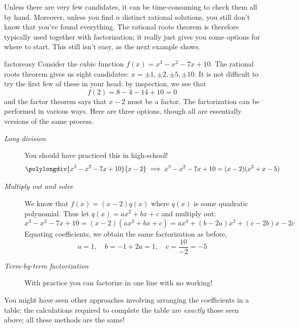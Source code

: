 Unless there are very few candidates, it can be time-consuming to check them all by hand. Moreover, unless you find $n$ distinct rational solutions, you still don't know that you've found everything. The rational roots theorem is therefore typically used together with factorization; it really just gives you some options for where to start. This still isn't easy, as the next example shows.
\goodbreak

\begin{example}{}{factoreasy}
Consider the cubic function $f(x)=x^3-x^2-7x+10$. The rational roots theorem gives us eight candidates: $x=\pm 1,\pm 2,\pm 5,\pm 10$. It is not difficult to try the first few of these in your head: by inspection, we see that
\[f(2)=8-4-14+10=0\]
and the factor theorem says that $x-2$ must be a factor. The factorization can be performed in various ways. Here are three options, though all are essentially versions of the same process.
\begin{description}
	\item[\normalfont\emph{Long division}]\lstsp You should have practiced this in high-school!
  \[\polylongdiv{x^3-x^2-7x+10}{x-2} \implies x^3-x^2-7x+10=(x-2)(x^2+x-5)\]
  \item[\normalfont\emph{Multiply out and solve}]\lstsp We know that $f(x)=(x-2)q(x)$ where $q(x)$ is some quadratic polynomial. Thus let $q(x)=ax^2+bx+c$ and multiply out:
  \[x^3-x^2-7x+10=(x-2)(ax^2+bx+c) =ax^3+(b-2a)x^2+(c-2b)x-2c\]
  Equating coefficients, we obtain the same factorization as before,
  \[a=1,\quad b=-1+2a=1,\quad c=\frac{10}{-2}=-5\]
  \item[\normalfont\emph{Term-by-term factorization}]\lstsp With practice you can factorize in one line with no working!
\end{description}
	
	You might have seen other approaches involving arranging the coefficients in a table; the calculations required to complete the table are \emph{exactly} those seen above; all these methods are the same!
\end{example}

